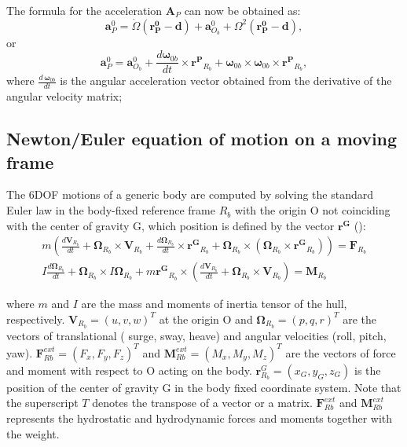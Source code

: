 \documentclass{article}
\newcommand{\ds}{\displaystyle}
\begin{document}
The formula for the acceleration  $\textbf{A}_P$ can now be obtained as:
\begin{equation} \mathbf{a}^0_P= \dot{\Omega}(\mathbf{r^0_P} - \textbf{d})  + \mathbf{a}^0_{O_b} + \Omega^2(\mathbf{r^0_P}-\textbf{d}),\end{equation}
or
\begin{equation} \mathbf{a}^0_P = \mathbf{a}^0_{O_b} + \frac{d \mathbf{ \omega}_{0b}}{dt}  \times  \mathbf{r^P}_{R_b} + \mathbf{ \omega}_{0b} \times \mathbf{ \omega}_{0b} \times \mathbf{r^P}_{R_b} ,\end{equation}
where $\frac{d \, \mathbf{ \omega}_{0b}}{dt}$ is the angular acceleration vector obtained from the derivative of the angular velocity matrix;








\subsection{Newton/Euler equation of motion on a moving frame}

The 6DOF motions of a generic body are computed by solving the standard Euler law in the body-fixed reference frame $R_b$ with the origin O not coinciding with the center of gravity G, which position is defined by the vector  $\mathbf{r^G}$  (\cite{fossen2011handbook}):
\begin{equation}
\label{eq:7}
\begin{array}{lll}
\ds m \left( \frac{d\mathbf{V}_{R_b}}{dt}+\mathbf{\Omega}_{R_b} \times \mathbf{V}_{R_b} +\frac{ d\mathbf{\Omega}_{R_b}}{dt} \times  \mathbf{r^G}_{R_b}  + \mathbf{\Omega}_{R_b} \times (\mathbf{ \Omega}_{R_b} \times  \mathbf{r^G}_{R_b})   \right) = \mathbf{F}_{R_b}
\\[0.5cm]
\ds I\frac{d\mathbf{\Omega}_{R_b}}{dt}+\mathbf{\Omega}_{R_b} \times I\mathbf{\Omega}_{R_b} + m \mathbf{r^G}_{R_b} \times \left( \frac{d\mathbf{V}_{R_b}}{dt} + \mathbf{\Omega}_{R_b} \times \mathbf{V}_{R_b}  \right)=\mathbf{M}_{R_b}
\end{array}
\end{equation}

where $m$ and $I$ are the mass and moments of inertia tensor of the hull, respectively. $\mathbf{V}_{R_b}=(u,v,w)^T$ at the origin O and $\mathbf{\Omega}_{R_b}=(p,q,r)^T$ are the vectors of translational ( surge, sway, heave) and angular velocities (roll, pitch, yaw). $\mathbf{F}^{ext}_{Rb}=(F_x, F_y, F_z)^T$ and $\mathbf{M}^{ext}_{Rb}=(M_x, M_y, M_z)^T$ are the vectors of  force and moment with respect to O acting on the body. $\mathbf{r}_{R_b}^{G} = (x_G, y_G, z_G)$ is the position of the center of gravity G in the body fixed coordinate system. Note that the superscript $T$ denotes the transpose of a vector or a matrix.
 $\mathbf{F}^{ext}_{Rb}$ and $\mathbf{M}^{ext}_{Rb}$ represents the hydrostatic and hydrodynamic forces and moments together with the weight.
\end{document}
